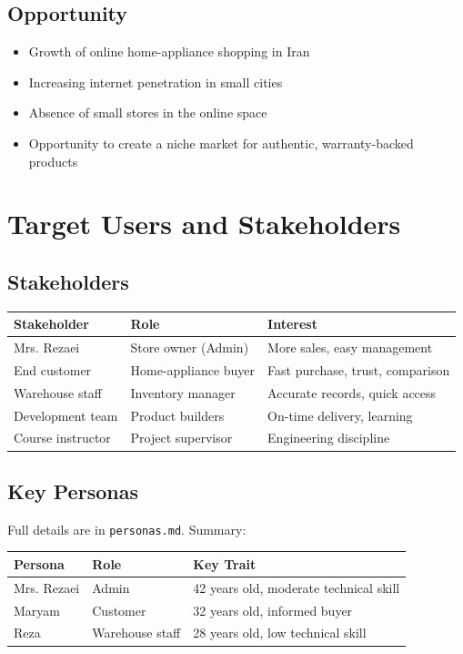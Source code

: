 \documentclass[12pt, a4paper]{article}
\begin{document}
\subsection{Opportunity}
\begin{itemize}
    \item Growth of online home-appliance shopping in Iran
    \item Increasing internet penetration in small cities
    \item Absence of small stores in the online space
    \item Opportunity to create a niche market for authentic, warranty-backed products
\end{itemize}

\section{Target Users and Stakeholders}

\subsection{Stakeholders}
\begin{center}
\begin{tabular}{|l|l|p{5cm}|}
\hline
\textbf{Stakeholder} & \textbf{Role} & \textbf{Interest} \\
\hline
Mrs. Rezaei & Store owner (Admin) & More sales, easy management \\
\hline
End customer & Home-appliance buyer & Fast purchase, trust, comparison \\
\hline
Warehouse staff & Inventory manager & Accurate records, quick access \\
\hline
Development team & Product builders & On-time delivery, learning \\
\hline
Course instructor & Project supervisor & Engineering discipline \\
\hline
\end{tabular}
\end{center}

\subsection{Key Personas}
Full details are in \texttt{personas.md}. Summary:
\begin{center}
\begin{tabular}{|l|l|l|}
\hline
\textbf{Persona} & \textbf{Role} & \textbf{Key Trait} \\
\hline
Mrs. Rezaei & Admin & 42 years old, moderate technical skill \\
\hline
Maryam & Customer & 32 years old, informed buyer \\
\hline
Reza & Warehouse staff & 28 years old, low technical skill \\
\hline
\end{tabular}
\end{center}
\end{document}
